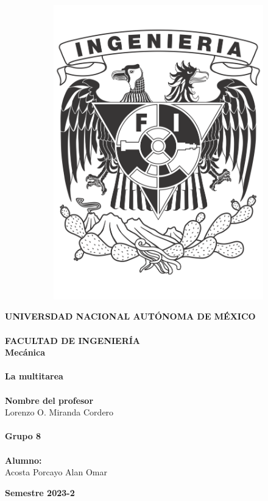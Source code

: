 \documentclass[12pt, titlepage]{article}
\begin{document}
\begin{titlepage}
\begin{figure}[ht]
\begin{subfigure}[l]{0.2\linewidth}
                \includegraphics[width=\textwidth]{Escudo_FI.png}
            \end{subfigure} 
        \end{figure}

        \large \textbf{UNIVERSDAD NACIONAL AUTÓNOMA DE MÉXICO\\}
        \textbf{\\FACULTAD DE INGENIERÍA\\} 
        \hfill \break
        \Large\textbf{Mecánica\\}
        \textbf{\\La multitarea\\}
        \Large \textbf{\\Nombre del profesor\\}
        \large Lorenzo O. Miranda Cordero\\
        \Large \textbf{\\Grupo 8\\}
        \textbf{\\Alumno:\\}
        Acosta Porcayo Alan Omar\\

        \vspace{1cm}
        \begin{flushright}
            \Large \textbf{Semestre 2023-2}
        \end{flushright}
    \end{titlepage}
\end{document}

